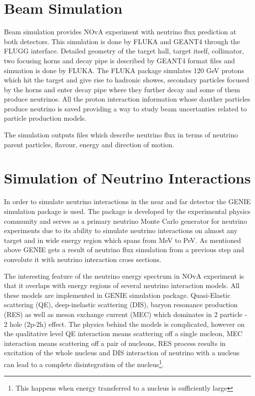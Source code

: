 \section{Beam Simulation}
Beam simulation provides NOvA experiment with neutrino flux prediction at both detectors. 
This simulation is done by FLUKA and GEANT4 through the FLUGG interface. Detailed geometry of
the target hall, target itself, collimator, two focusing horns and decay pipe is described by
GEANT4 format files and simuation is done by FLUKA. The FLUKA package simulates 120 GeV protons
which hit the target and give rise to hadronic showes, secondary particles focused by the horns 
and enter decay pipe where they further decay and some of them produce neutrinos. All the proton 
interaction information whose dauther particles produce neutrino is saved providing a way to 
study beam uncertanties related to particle production models. 

The simulation outputs files which describe neutrino flux in terms of neutrino parent particles, 
flavour, energy and direction of motion.

\section{Simulation of Neutrino Interactions}
In order to simulate neutrino interactions in the near and far detector the GENIE simulation 
package is used. The package is developed by the experimental physics community and serves as a 
primary neutrino Monte Carlo generator for neutrino experiments due to its ability to simulate neutrino
interactions on almost any target and in wide energy region which spans from MeV to PeV. As mentioned 
above GENIE gets a result of neutrino flux simulation from a previous step and convolute it with
neutrino interaction cross sections.

The interesting feature of the neutrino energy spectrum in NOvA experiment is that it overlaps 
with energy regions of several neutrino interaction models. All these models are implemented in GENIE
simulation package. Quasi-Elastic scattering (QE), deep-inelastic scattering (DIS), baryon resonance 
production (RES) as well as meson exchange current (MEC) which dominates in 2 particle - 2 hole (2p-2h) 
effect\cite{MEC}. The physics behind the models is complicated, however on the qualitative level QE interaction 
means scattering off a single nucleon, MEC interaction means scattering off a pair of nucleons, RES process
results in excitation of the whole nucleus and DIS interaction of neutrino with a nucleus can lead to a 
complete disintegration of the nucleus\footnote{This happens when energy transferred to a nucleus is 
sufficiently large}.
